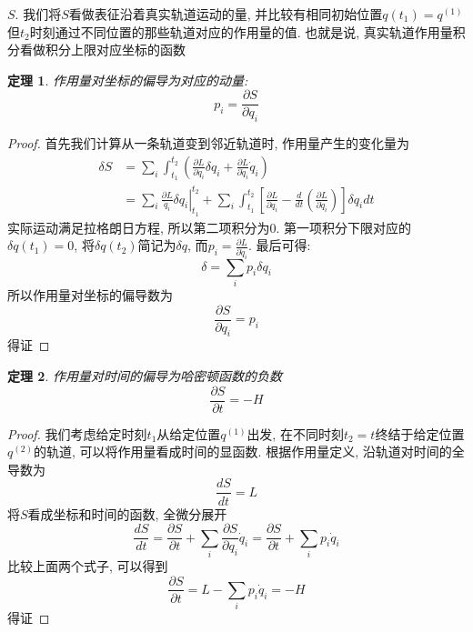\documentclass[a4paper,11pt]{article}
\newtheorem{theorem}{\hspace{2em}定理}[section]
\newtheorem{proof}{证明}[section]
\begin{document}
$S$. 我们将$S$看做表征沿着真实轨道运动的量, 并比较有相同初始位置$q(t_1)=q^{(1)}$但$t_2$时刻通过不同位置的那些轨道对应的作用量的值. 也就是说, 真实轨道作用量积分看做积分上限对应坐标的函数
\begin{theorem}
  作用量对坐标的偏导为对应的动量:
\begin{equation}\label{Action Axe}
  p_i=\frac{\partial S}{\partial{q_i}}
\end{equation}
\end{theorem}
\begin{proof}
  首先我们计算从一条轨道变到邻近轨道时, 作用量产生的变化量为
\begin{equation*}
  \begin{split}
     \delta S & =\sum_{i}\int_{t_1}^{t_2}\left(\frac{\partial L}{\partial{q_i}}\delta{q_i}+\frac{\partial L}{\partial{\dot{q}_i}}\dot{q}_i\right) \\
       &=\left.\sum_{i}\frac{\partial L}{\dot{q}_i}\delta q_i\right|^{t_2}_{t_1}+\sum_{i}\int_{t_1}^{t_2}\left[\frac{\partial L}{\partial{q_i}}-\frac{d}{dt}\left(\frac{\partial L}{\partial{\dot{q}_i}}\right)\right]\delta q_idt
  \end{split}
\end{equation*}
实际运动满足拉格朗日方程, 所以第二项积分为$0$. 第一项积分下限对应的$\delta q(t_1)=0$, 将$\delta q(t_2)$简记为$\delta q$, 而$p_i=\frac{\partial L}{\partial\dot{q}_i}$. 最后可得:
\begin{equation*}
  \delta=\sum_{i}p_i\delta q_i
\end{equation*}
所以作用量对坐标的偏导数为
\begin{equation*}
  \frac{\partial S}{\partial{q_i}}=p_i
\end{equation*}
得证
\end{proof}
\begin{theorem}\label{Action time}
  作用量对时间的偏导为哈密顿函数的负数
\begin{equation*}
  \frac{\partial S}{\partial t}=-H
\end{equation*}
\end{theorem}
\begin{proof}
  我们考虑给定时刻$t_1$从给定位置$q^{(1)}$出发, 在不同时刻$t_2=t$终结于给定位置$q^{(2)}$的轨道, 可以将作用量看成时间的显函数. 根据作用量定义, 沿轨道对时间的全导数为
\begin{equation*}
  \frac{dS}{dt}=L
\end{equation*}
将$S$看成坐标和时间的函数, 全微分展开
\begin{equation*}
  \frac{dS}{dt}=\frac{\partial S}{\partial t}+\sum_{i}\frac{\partial S}{\partial{q_i}}\dot{q}_i=\frac{\partial S}{\partial t}+\sum_{i}p_i\dot{q}_i
\end{equation*}
比较上面两个式子, 可以得到
\begin{equation*}
  \frac{\partial S}{\partial t}=L-\sum_{i}p_i\dot{q}_i=-H
\end{equation*}
得证
\end{proof}
\end{document}
